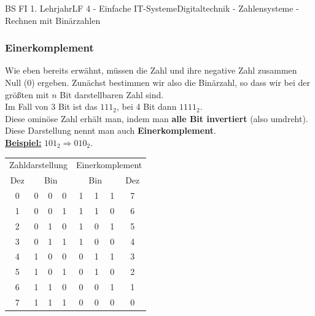 \documentclass[11pt,twocolumn,oneside,openany,headings=optiontotoc,11pt,numbers=noenddot]{article}
\begin{document}
\begin{worksheet}{BS FI 1. Lehrjahr}{LF 4 - Einfache IT-Systeme}{Digitaltechnik - Zahlensysteme - Rechnen mit Binärzahlen}
		\subsubsection{Einerkomplement}
		Wie eben bereits erwähnt, müssen die Zahl und ihre negative Zahl zusammen Null (0) ergeben. Zunächst bestimmen wir also die Binärzahl, so dass wir bei der größten mit \(n\) Bit darstellbaren Zahl sind.\\
		\tiny{Im Fall von 3 Bit ist das \(111_2\), bei 4 Bit dann \(1111_2\).}\normalsize\\
		Diese ominöse Zahl erhält man, indem man \textbf{alle Bit invertiert} (also umdreht). Diese Darstellung nennt man auch \textbf{Einerkomplement}.\\
		\textbf{\underline{Beispiel:}} \(101_2 \Rightarrow 010_2\).\\
		\par\noindent
		\begin{tabularx}{0.48\textwidth}{c|lll||rrr|c}
			\multicolumn{4}{c||}{Zahldarstellung} & \multicolumn{4}{c}{Einerkomplement}\\
			Dez & \multicolumn{3}{c||}{Bin} & \multicolumn{3}{c}{Bin} & Dez\\
			\cline{1-8}
			0 & 0 & 0 & 0 & 1 & 1 & 1 & 7\\
			1 & 0 & 0 & 1 & 1 & 1 & 0 & 6\\
			2 & 0 & 1 & 0 & 1 & 0 & 1 & 5\\
			3 & 0 & 1 & 1 & 1 & 0 & 0 & 4\\
			4 & 1 & 0 & 0 & 0 & 1 & 1 & 3\\
			5 & 1 & 0 & 1 & 0 & 1 & 0 & 2\\
			6 & 1 & 1 & 0 & 0 & 0 & 1 & 1\\
			7 & 1 & 1 & 1 & 0 & 0 & 0 & 0
		\end{tabularx}\\

\end{worksheet}
\end{document}
